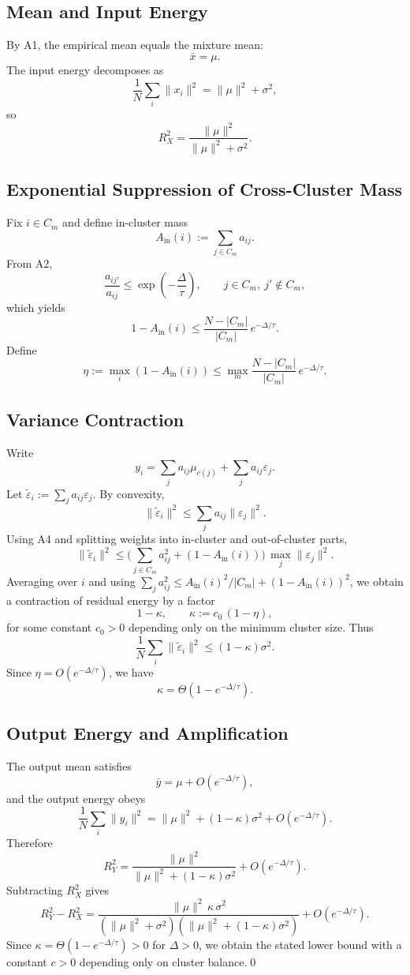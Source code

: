 \subsection{Mean and Input Energy}

By A1, the empirical mean equals the mixture mean:
\[
 \bar x = \mu.
\]
The input energy decomposes as
\[
 \frac1N\sum_i \|x_i\|^2 = \|\mu\|^2 + \sigma^2,
\]
so
\[
 R_X^2 = \frac{\|\mu\|^2}{\|\mu\|^2 + \sigma^2}.
\]

\subsection{Exponential Suppression of Cross-Cluster Mass}

Fix $i\in C_m$ and define in-cluster mass
\[
 A_{\mathrm{in}}(i) := \sum_{j\in C_m} a_{ij}.
\]
From A2,
\[
 \frac{a_{ij'}}{a_{ij}} \le \exp\!\left(-\frac{\Delta}{\tau}\right),
\qquad j\in C_m,\ j'\notin C_m,
\]
which yields
\[
 1-A_{\mathrm{in}}(i)
 \le \frac{N-|C_m|}{|C_m|}\,e^{-\Delta/\tau}.
\]
Define
\[
 \eta := \max_i (1-A_{\mathrm{in}}(i))
 \le \max_m \frac{N-|C_m|}{|C_m|}\,e^{-\Delta/\tau}.
\]

\subsection{Variance Contraction}

Write
\[
 y_i = \sum_j a_{ij}\mu_{c(j)} + \sum_j a_{ij}\varepsilon_j.
\]
Let $\tilde\varepsilon_i := \sum_j a_{ij}\varepsilon_j$. By convexity,
\[
 \|\tilde\varepsilon_i\|^2 \le \sum_j a_{ij}\|\varepsilon_j\|^2.
\]
Using A4 and splitting weights into in-cluster and out-of-cluster parts,
\[
 \|\tilde\varepsilon_i\|^2
 \le
 \Big(\sum_{j\in C_m} a_{ij}^2 + (1-A_{\mathrm{in}}(i))\Big)\,\max_j \|\varepsilon_j\|^2.
\]
Averaging over $i$ and using $\sum_j a_{ij}^2 \le A_{\mathrm{in}}(i)^2/|C_m| + (1-A_{\mathrm{in}}(i))^2$,
we obtain a contraction of residual energy by a factor
\[
 1-\kappa,\qquad
 \kappa := c_0\,(1-\eta),
\]
for some constant $c_0>0$ depending only on the minimum cluster size.
Thus
\[
 \frac1N\sum_i \|\tilde\varepsilon_i\|^2 \le (1-\kappa)\sigma^2.
\]
Since $\eta=O(e^{-\Delta/\tau})$, we have
\[
 \kappa = \Theta(1-e^{-\Delta/\tau}).
\]

\subsection{Output Energy and Amplification}

The output mean satisfies
\[
 \bar y = \mu + O(e^{-\Delta/\tau}),
\]
and the output energy obeys
\[
 \frac1N\sum_i \|y_i\|^2 = \|\mu\|^2 + (1-\kappa)\sigma^2 + O(e^{-\Delta/\tau}).
\]
Therefore
\[
 R_Y^2
 =
 \frac{\|\mu\|^2}{\|\mu\|^2+(1-\kappa)\sigma^2}
 + O(e^{-\Delta/\tau}).
\]
Subtracting $R_X^2$ gives
\[
 R_Y^2 - R_X^2
 =
 \frac{\|\mu\|^2\,\kappa\,\sigma^2}{(\|\mu\|^2+\sigma^2)(\|\mu\|^2+(1-\kappa)\sigma^2)}
 + O(e^{-\Delta/\tau}).
\]
Since $\kappa=\Theta(1-e^{-\Delta/\tau})>0$ for $\Delta>0$, we obtain the stated
lower bound with a constant $c>0$ depending only on cluster balance.\qed